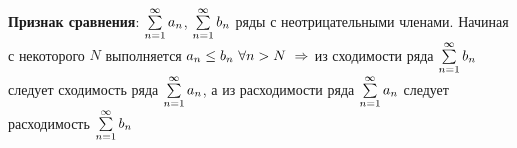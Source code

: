 \begin{proofs}
	\begin{enumerate*}
		\item \textbf{Признак сравнения}:  $\sum\limits_{n=1}^{\infty}a_n$, $\sum\limits_{n=1}^{\infty}b_n$ ряды с неотрицательными членами. Начиная с некоторого $N$ выполняется $a_n \leq b_n \ \forall n > N \ \sledue$ из сходимости ряда $\sum\limits_{n=1}^{\infty}b_n$ следует сходимость ряда $\sum\limits_{n=1}^{\infty}a_n$, а из расходимости ряда $\sum\limits_{n=1}^{\infty}a_n$ следует расходимость $\sum\limits_{n=1}^{\infty}b_n$
	\end{enumerate*}

\end{proofs}
